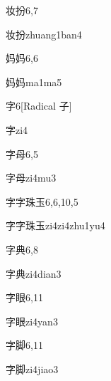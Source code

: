 \begin{entry}{妆扮}{6,7}
  \begin{phonetics}{妆扮}{zhuang1ban4}
  \end{phonetics}
\end{entry}

\begin{entry}{妈妈}{6,6}
  \begin{phonetics}{妈妈}{ma1ma5}
  \end{phonetics}
\end{entry}

\begin{entry}{字}{6}[Radical 子]
  \begin{phonetics}{字}{zi4}
  \end{phonetics}
\end{entry}

\begin{entry}{字母}{6,5}
  \begin{phonetics}{字母}{zi4mu3}
  \end{phonetics}
\end{entry}

\begin{entry}{字字珠玉}{6,6,10,5}
  \begin{phonetics}{字字珠玉}{zi4zi4zhu1yu4}
  \end{phonetics}
\end{entry}

\begin{entry}{字典}{6,8}
  \begin{phonetics}{字典}{zi4dian3}
  \end{phonetics}
\end{entry}

\begin{entry}{字眼}{6,11}
  \begin{phonetics}{字眼}{zi4yan3}
  \end{phonetics}
\end{entry}

\begin{entry}{字脚}{6,11}
  \begin{phonetics}{字脚}{zi4jiao3}
  \end{phonetics}
\end{entry}

